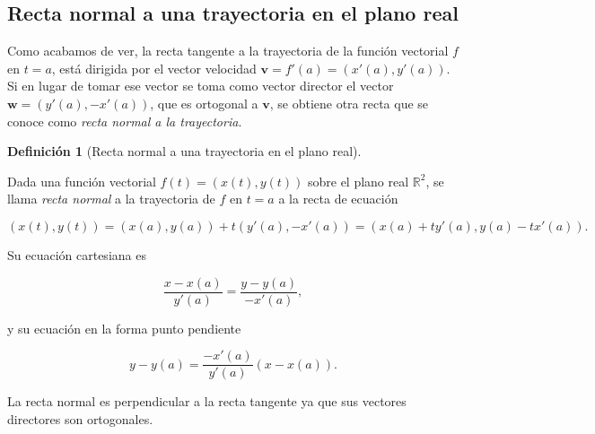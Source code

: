 \documentclass[
  a4paper,
]{scrreport}
\theoremstyle{definition}
\theoremstyle{plain}
\theoremstyle{plain}
\theoremstyle{plain}
\theoremstyle{definition}
\newtheorem{definition}{Definición}[chapter]
\theoremstyle{remark}
\begin{document}
\hypertarget{recta-normal-a-una-trayectoria-en-el-plano-real}{%
\subsection{Recta normal a una trayectoria en el plano
real}\label{recta-normal-a-una-trayectoria-en-el-plano-real}}

Como acabamos de ver, la recta tangente a la trayectoria de la función
vectorial \(f\) en \(t=a\), está dirigida por el vector velocidad
\(\mathbf{v}=f'(a)=(x'(a),y'(a))\). Si en lugar de tomar ese vector se
toma como vector director el vector \(\mathbf{w}=(y'(a),-x'(a))\), que
es ortogonal a \(\mathbf{v}\), se obtiene otra recta que se conoce como
\emph{recta normal a la trayectoria}.

\begin{definition}[Recta normal a una trayectoria en el plano
real]\protect\hypertarget{def-normal-trayectoria-plano}{}\label{def-normal-trayectoria-plano}

Dada una función vectorial \(f(t)=(x(t),y(t))\) sobre el plano real
\(\mathbb{R}^2\), se llama \emph{recta normal} a la trayectoria de \(f\)
en \(t=a\) a la recta de ecuación

\[
(x(t),y(t)) = (x(a),y(a))+t(y'(a),-x'(a)) = (x(a)+ty'(a),y(a)-tx'(a)).
\]

\end{definition}

Su ecuación cartesiana es

\[
\frac{x-x(a)}{y'(a)} = \frac{y-y(a)}{-x'(a)},
\]

y su ecuación en la forma punto pendiente

\[
y-y(a) = \frac{-x'(a)}{y'(a)}(x-x(a)).
\]

\begin{tcolorbox}[enhanced jigsaw, rightrule=.15mm, colframe=quarto-callout-note-color-frame, arc=.35mm, leftrule=.75mm, colbacktitle=quarto-callout-note-color!10!white, bottomrule=.15mm, toptitle=1mm, breakable, opacitybacktitle=0.6, coltitle=black, left=2mm, colback=white, titlerule=0mm, opacityback=0, title=\textcolor{quarto-callout-note-color}{\faInfo}\hspace{0.5em}{Nota}, toprule=.15mm, bottomtitle=1mm]

La recta normal es perpendicular a la recta tangente ya que sus vectores
directores son ortogonales.

\end{tcolorbox}
\end{document}
